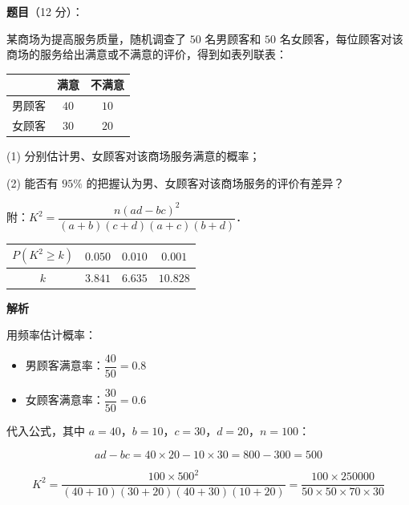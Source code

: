 \begin{answer}

\textbf{题目}（12 分）：

某商场为提高服务质量，随机调查了 $50$ 名男顾客和 $50$ 名女顾客，每位顾客对该商场的服务给出满意或不满意的评价，得到如表列联表：

\begin{center}
\begin{tabular}{ccc}
\toprule
 & 满意 & 不满意 \\
\midrule
男顾客 & $40$ & $10$ \\
女顾客 & $30$ & $20$ \\
\bottomrule
\end{tabular}
\end{center}

  (1) 分别估计男、女顾客对该商场服务满意的概率；

  (2) 能否有 $95\%$ 的把握认为男、女顾客对该商场服务的评价有差异？

  附：$K^{2}=\dfrac{n(ad-bc)^{2}}{(a+b)(c+d)(a+c)(b+d)}$．

\begin{center}
\begin{tabular}{cccc}
\toprule
$P\left(K^{2}\ge k\right)$ & $0.050$ & $0.010$ & $0.001$ \\
\midrule
$k$ & $3.841$ & $6.635$ & $10.828$ \\
\bottomrule
\end{tabular}
\end{center}

\textbf{解析}


用频率估计概率：

\begin{itemize}
\item 男顾客满意率：$\dfrac{40}{50}=0.8$
\item 女顾客满意率：$\dfrac{30}{50}=0.6$
\end{itemize}


代入公式，其中 $a=40$，$b=10$，$c=30$，$d=20$，$n=100$：

\nopagebreak[4]
\[ad-bc=40\times20-10\times30=800-300=500\]

\nopagebreak[4]
\[K^{2}=\frac{100\times500^{2}}{(40+10)(30+20)(40+30)(10+20)}=\frac{100\times250000}{50\times50\times70\times30}\]


\end{answer}
